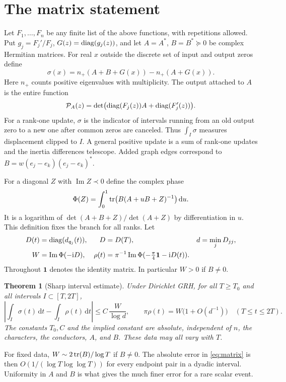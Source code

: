\documentclass[11pt]{article}
\newtheorem{theorem}{Theorem}
\newcommand{\dd}{\,\mathrm d}\newcommand{\ii}{\mathrm i}
\newcommand{\Imn}{\operatorname{Im}}\newcommand{\Ren}{\operatorname{Re}}
\newcommand{\id}{\mathbf1}\newcommand{\norm}[1]{\left\lVert#1\right\rVert}
\newcommand{\ph}{\Phi}\newcommand{\Gm}{G_0}
\begin{document}
\section{The matrix statement}
Let $F_1,\ldots,F_n$ be any finite list of the above functions, with repetitions allowed. Put $g_j=F_j'/F_j$, $G(z)=\operatorname{diag}(g_j(z))$, and let $A=A^*$, $B=B^*\succeq0$ be complex Hermitian matrices. For real $x$ outside the discrete set of input and output zeros define
\[
 \sigma(x)=n_+(A+B+G(x))-n_+(A+G(x)).
\]
Here $n_+$ counts positive eigenvalues with multiplicity. The output attached to $A$ is the entire function
\[
 \mathcal P_A(z)=\det\bigl(\operatorname{diag}(F_j(z))A+\operatorname{diag}(F'_j(z))\bigr).
\]
For a rank-one update, $\sigma$ is the indicator of intervals running from an old output zero to a new one after common zeros are canceled. Thus $\int_I\sigma$ measures displacement clipped to $I$. A general positive update is a sum of rank-one updates and the inertia differences telescope. Added graph edges correspond to $B=w(e_j-e_k)(e_j-e_k)^*$.

For a diagonal $Z$ with $\Imn Z\prec0$ define the complex phase
\begin{equation}\label{eq:phase}
 \ph(Z)=\int_0^1\tr\bigl(B(A+uB+Z)^{-1}\bigr)\dd u.
\end{equation}
It is a logarithm of $\det(A+B+Z)/\det(A+Z)$ by differentiation in $u$. This definition fixes the branch for all ranks. Let
\begin{align}
 D(t)&=\diag(d_{q_j}(t)), &D&=D(T), &d&=\min_j D_{jj},\notag\\
 W&=\Imn\ph(-\ii D),&
 \rho(t)&=\pi^{-1}\Imn\ph(-\tfrac\pi4\id-\ii D(t)).\label{eq:rho}
\end{align}
Throughout $\id$ denotes the identity matrix. In particular $W>0$ if $B\ne0$.

\begin{theorem}[Sharp interval estimate]\label{th:matrix}
Under Dirichlet GRH, for all $T\ge T_0$ and all intervals $I\subset[T,2T]$,
\begin{equation}\label{eq:matrix}
 \left|\int_I\sigma(t)\dd t-\int_I\rho(t)\dd t\right|
 \le C\,\frac{W}{\log d},\qquad
 \pi\rho(t)=W\bigl(1+O(d^{-1})\bigr)\quad(T\le t\le2T).
\end{equation}
The constants $T_0,C$ and the implied constant are absolute, independent of $n$, the characters, the conductors, $A$, and $B$. These data may all vary with $T$.
\end{theorem}

For fixed data, $W\sim 2\operatorname{tr}(B)/\log T$ if $B\ne0$. The absolute error in \eqref{eq:matrix} is then $O(1/(\log T\log\log T))$ for every endpoint pair in a dyadic interval. Uniformity in $A$ and $B$ is what gives the much finer error for a rare scalar event.
\end{document}
